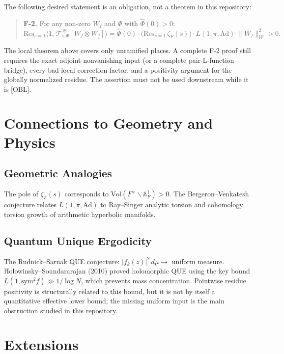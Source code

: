 \documentclass[12pt]{article}
\begin{document}
The following desired statement is an obligation, not a theorem in this repository:

\begin{quote}
\textbf{F-2.}
For any non-zero $W_f$ and $\Phi$ with $\hat\Phi(0) > 0$:
\[
  \mathrm{Res}_{s=1}\langle 1,\, \mathcal{T}_{s,\Phi}^{\mathrm{JS}}[W_f\otimes W_{\bar f}]\rangle
  = \hat\Phi(0)\cdot\bigl(\mathrm{Res}_{s=1}\,\zeta_F(s)\bigr)\cdot L(1,\pi,\mathrm{Ad})
    \cdot\|W_f\|_\mathcal{W}^2 > 0.
\]
\end{quote}

The local theorem above covers only unramified places.  A complete F-2 proof
still requires the exact adjoint nonvanishing input (or a complete
pair-L-function bridge), every bad local correction factor, and a positivity
argument for the globally normalized residue.  The assertion must not be used
downstream while it is [OBL].

\section{Connections to Geometry and Physics}

\subsection{Geometric Analogies}

The pole of $\zeta_F(s)$ corresponds to $\mathrm{Vol}(F^\times\backslash\mathbb{A}_F^1) > 0$.
The Bergeron--Venkatesh conjecture relates $L(1,\pi,\mathrm{Ad})$ to Ray--Singer analytic
torsion and cohomology torsion growth of arithmetic hyperbolic manifolds.

\subsection{Quantum Unique Ergodicity}

The Rudnick--Sarnak QUE conjecture: $|f_k(z)|^2\,d\mu \to$ uniform measure.
Holowinsky--Soundararajan (2010) proved holomorphic QUE using the key bound
$L(1,\mathrm{sym}^2 f) \gg 1/\log N$, which prevents mass concentration.
Pointwise residue positivity is structurally related to this bound, but it is
not by itself a quantitative effective lower bound; the missing uniform input is
the main obstruction studied in this repository.

\section{Extensions}
\end{document}
